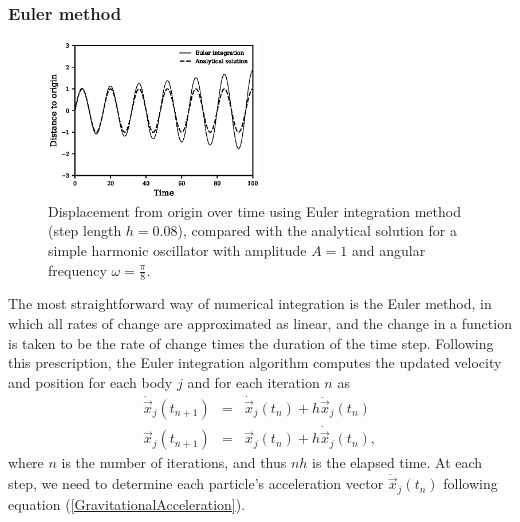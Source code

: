 \documentclass[11pt,twocolumn]{article}
\begin{document}
        
            \subsubsection{Euler method}
            
            	\begin{figure}
                \centering
  				\includegraphics[width=0.5\textwidth]{num_st/euler.eps}
  				\caption{Displacement from origin over time using Euler integration method (step length $h = 0.08$), compared with the
                analytical solution for a simple harmonic oscillator with amplitude $A = 1$ and angular frequency $\omega = \frac{\pi}{8}$.}
  				\label{fig:euler}
				\end{figure}
                
                The most straightforward way of numerical integration is the Euler method, in which all rates of change are approximated as linear, and the change in a function is taken to be the rate of change times the duration of the time step. Following this prescription, the Euler integration algorithm computes the updated velocity and position for each body $j$ and for each iteration $n$  as           
                \begin{eqnarray}
                \dot{\vec{x}}_j(t_{n+1})& =& \dot{\vec{x}}_j(t_n) + h \ddot{\vec{x}}_j(t_n)
                \label{EulerAcceleration}\\[0.5em]
                \vec{x}_j(t_{n+1})& =& \vec{x}_j(t_n) + h \dot{\vec{x}}_j(t_n),
                \end{eqnarray}
                where $n$ is the number of iterations, and thus $n h$ is the elapsed time. At each step, we need to determine each particle's acceleration vector $\ddot{\vec{x}}_{j}(t_n)$ following equation (\ref{GravitationalAcceleration}).
                
\end{document}
